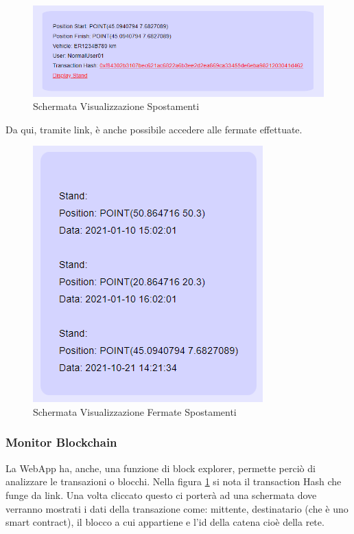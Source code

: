 \documentclass[11pt,a4paper,titlepage,twoside,openright]{report}
\begin{document}
\begin{figure}[h]
	\includegraphics[width=\textwidth]{Log_Print}
	\centering
	\caption{Schermata Visualizzazione Spostamenti}
	\label{fig:Log_Print}
\end{figure}

Da qui, tramite link, è anche possibile accedere alle fermate effettuate.
\begin{figure}[h]
	\includegraphics[height=0.35\textheight]{Stand_Print}
	\centering
	\caption{Schermata Visualizzazione Fermate Spostamenti}
	\label{fig:Log_Stand_Print}
\end{figure}

\subsubsection{Monitor Blockchain}
La WebApp ha, anche, una funzione di block explorer, permette perciò di analizzare le transazioni o blocchi. Nella figura  \ref{fig:Log_Print} si nota il transaction Hash che funge da link. Una volta cliccato questo ci porterà ad una schermata dove verranno mostrati i dati della transazione come: mittente, destinatario (che è uno smart contract), il blocco a cui appartiene e l'id della catena cioè della rete.
\end{document}
